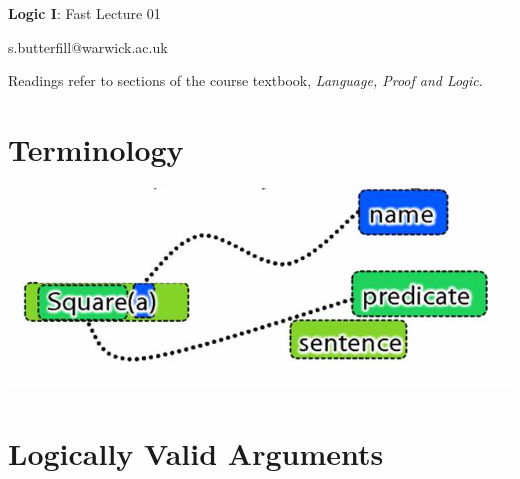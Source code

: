 \documentclass[12pt]{extarticle}
\date{}
\makeatletter
\def \ititle {Origins of Mind}
\def \isubtitle {Lecture 08}
\def \iemail{s.butterfill@warwick.ac.uk}
\makeatother
\begin{document}
\raggedcolumns

\begin{multicols*}{3}

\setlength\footnotesep{1em}









\def \ititle {Logic I}
 
\def \isubtitle {Fast Lecture 01}
 
\begin{center}
 
{\Large
 
\textbf{\ititle}: \isubtitle
 
}
 
 
 
\iemail %
 
\end{center}
 
Readings refer to sections of the course textbook, \emph{Language, Proof and Logic}.
 
 
 
\section{Terminology}
 
\begin{center}
\includegraphics[scale=0.3]{img/name_predicate_sentence.png}
\end{center}
 
 
\section{Logically Valid Arguments}
 

\end{multicols*}
\end{document}
